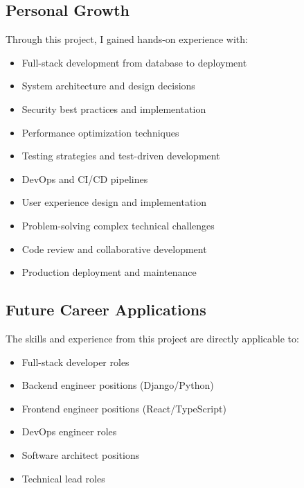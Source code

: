 \documentclass[11pt,a4paper]{article}
\begin{document}
\subsection{Personal Growth}
Through this project, I gained hands-on experience with:
\begin{itemize}[leftmargin=*]
    \item Full-stack development from database to deployment
    \item System architecture and design decisions
    \item Security best practices and implementation
    \item Performance optimization techniques
    \item Testing strategies and test-driven development
    \item DevOps and CI/CD pipelines
    \item User experience design and implementation
    \item Problem-solving complex technical challenges
    \item Code review and collaborative development
    \item Production deployment and maintenance
\end{itemize}

\subsection{Future Career Applications}
The skills and experience from this project are directly applicable to:
\begin{itemize}[leftmargin=*]
    \item Full-stack developer roles
    \item Backend engineer positions (Django/Python)
    \item Frontend engineer positions (React/TypeScript)
    \item DevOps engineer roles
    \item Software architect positions
    \item Technical lead roles
\end{itemize}
\end{document}
